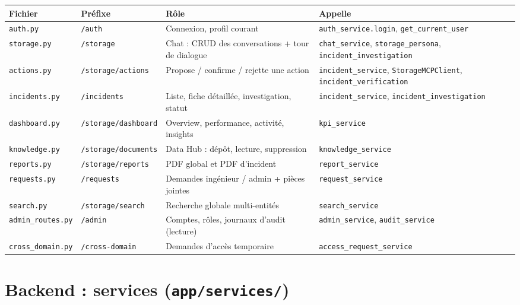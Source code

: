 \documentclass[11pt,a4paper]{report}
\newcommand{\file}[1]{\texttt{\small #1}}
\newcommand{\fn}[1]{\texttt{\small\textcolor{oasisviolet}{#1}}}
\newcommand{\cls}[1]{\texttt{\small\textcolor{oasisblue}{#1}}}
\newcommand{\route}[1]{\texttt{\small\textcolor{oasisgreen}{#1}}}
\begin{document}
\begin{longtable}{@{}p{2.7cm}p{3.1cm}p{4.5cm}p{4.0cm}@{}}
\toprule
\textbf{Fichier} & \textbf{Préfixe} & \textbf{Rôle} & \textbf{Appelle}\\
\midrule
\endhead
\file{auth.py} & \route{/auth} & Connexion, profil courant & \fn{auth\_service.login}, \fn{get\_current\_user}\\
\file{storage.py} & \route{/storage} & Chat : CRUD des conversations + tour de dialogue & \fn{chat\_service}, \fn{storage\_persona}, \fn{incident\_investigation}\\
\file{actions.py} & \route{/storage/actions} & Propose / confirme / rejette une action & \fn{incident\_service}, \cls{StorageMCPClient}, \fn{incident\_verification}\\
\file{incidents.py} & \route{/incidents} & Liste, fiche détaillée, investigation, statut & \fn{incident\_service}, \fn{incident\_investigation}\\
\file{dashboard.py} & \route{/storage/dashboard} & Overview, performance, activité, insights & \fn{kpi\_service}\\
\file{knowledge.py} & \route{/storage/documents} & Data Hub : dépôt, lecture, suppression & \fn{knowledge\_service}\\
\file{reports.py} & \route{/storage/reports} & PDF global et PDF d'incident & \fn{report\_service}\\
\file{requests.py} & \route{/requests} & Demandes ingénieur / admin + pièces jointes & \fn{request\_service}\\
\file{search.py} & \route{/storage/search} & Recherche globale multi-entités & \fn{search\_service}\\
\file{admin\_routes.py} & \route{/admin} & Comptes, rôles, journaux d'audit (lecture) & \fn{admin\_service}, \fn{audit\_service}\\
\file{cross\_domain.py} & \route{/cross-domain} & Demandes d'accès temporaire & \fn{access\_request\_service}\\
\bottomrule
\end{longtable}

\section{Backend : services (\file{app/services/})}
\end{document}
